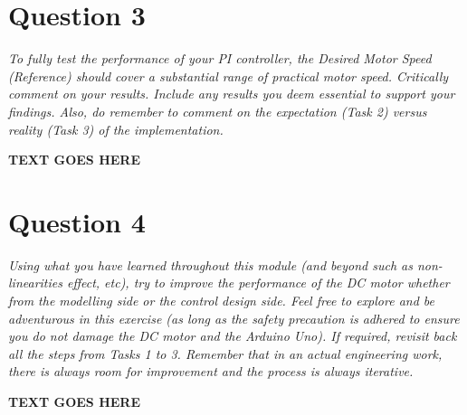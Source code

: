 \documentclass[11pt, onecolumn]{article}
\begin{document}
\section*{Question 3}
\par \textit{To fully test the performance of your PI controller, the Desired Motor Speed (Reference) should cover a substantial range of practical motor speed. Critically comment on your results. Include any results you deem essential to support your findings. Also, do remember to comment on the expectation (Task 2) versus reality (Task 3) of the implementation.}
\noindent\makebox[\linewidth]{\rule{\textwidth}{0.4pt}}
\par \textbf{TEXT GOES HERE}
\section*{Question 4}
\par \textit{Using what you have learned throughout this module (and beyond such as non- linearities effect, etc), try to improve the performance of the DC motor whether from the modelling side or the control design side. Feel free to explore and be adventurous in this exercise (as long as the safety precaution is adhered to ensure you do not damage the DC motor and the Arduino Uno). If required, revisit back all the steps from Tasks 1 to 3. Remember that in an actual engineering work, there is always room for improvement and the process is always iterative.}
\noindent\makebox[\linewidth]{\rule{\textwidth}{0.4pt}}
\par \textbf{TEXT GOES HERE}


\end{document}
